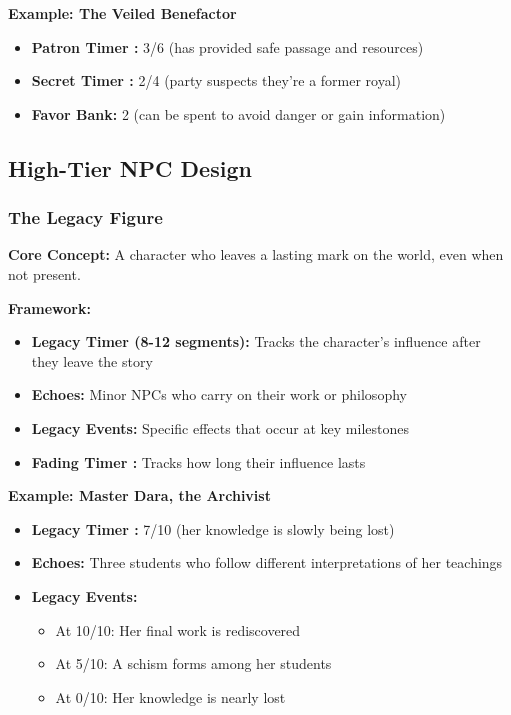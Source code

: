 \documentclass[10pt]{article}
\begin{document}
\textbf{Example: The Veiled Benefactor}
\begin{itemize}
  \item \textbf{Patron Timer :} 3/6 (has provided safe passage and resources)
  \item \textbf{Secret Timer :} 2/4 (party suspects they're a former royal)
  \item \textbf{Favor Bank:} 2 (can be spent to avoid danger or gain information)
\end{itemize}

\subsection{High-Tier NPC Design}

\subsubsection{The Legacy Figure}

\textbf{Core Concept:} A character who leaves a lasting mark on the world, even when not present.

\textbf{Framework:}
\begin{itemize}
  \item \textbf{Legacy Timer (8-12 segments):} Tracks the character's influence after they leave the story
  \item \textbf{Echoes:} Minor NPCs who carry on their work or philosophy
  \item \textbf{Legacy Events:} Specific effects that occur at key milestones
  \item \textbf{Fading Timer :} Tracks how long their influence lasts
\end{itemize}

\textbf{Example: Master Dara, the Archivist}
\begin{itemize}
  \item \textbf{Legacy Timer :} 7/10 (her knowledge is slowly being lost)
  \item \textbf{Echoes:} Three students who follow different interpretations of her teachings
  \item \textbf{Legacy Events:}
    \begin{itemize}
      \item At 10/10: Her final work is rediscovered
      \item At 5/10: A schism forms among her students
      \item At 0/10: Her knowledge is nearly lost
    \end{itemize}
\end{itemize}
\end{document}
